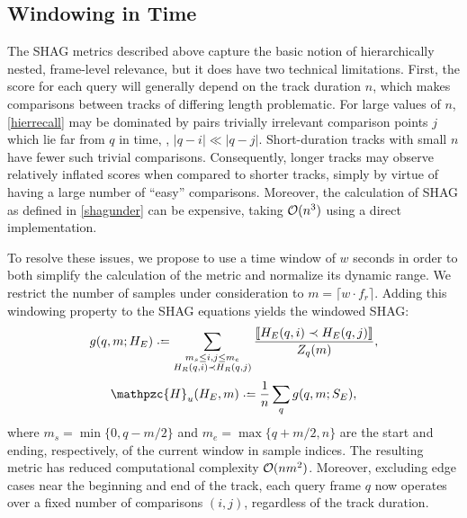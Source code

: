 \documentclass{article}
\def\shag{\ensuremath{\mathpzc{H}}}
\begin{document}

\subsection{Windowing in Time}

The SHAG metrics described above capture the basic notion of hierarchically nested, frame-level relevance, but it does have two technical limitations.
First, the score for each query will generally depend on the track duration $n$, which makes comparisons between tracks of differing length problematic.  
For large values of $n$, \cref{hierrecall} may be dominated by pairs trivially irrelevant comparison points $j$ which lie far from $q$ in time, \ie, $|q-i| \ll |q-j|$.
Short-duration tracks with small $n$ have fewer such trivial comparisons.
Consequently, longer tracks may observe relatively inflated scores when compared to shorter tracks, simply by virtue of having a large number of ``easy'' comparisons.
Moreover, the calculation of SHAG as defined in \cref{shagunder} can be expensive, taking $\mathcal{O}(n^3)$ using a direct implementation.

To resolve these issues, we propose to use a time window of $w$ seconds in order to both simplify the 
calculation of the metric and normalize its dynamic range.
We restrict the number of samples under consideration to $m = \lceil w \cdot f_r \rceil$.
Adding this windowing property to the SHAG equations yields the windowed SHAG:
\begin{equation}
  g(q, m ; H_E) \defeq \sum_{\substack{
  m_s \leq i,j \leq m_e \\ 
  H_R(q, i) \prec H_R(q, j) }} \frac{\ind{H_E(q, i) \prec H_E(q,
  j)}}{Z_q(m)},\label{windowrecall}
\end{equation}
\begin{equation}
\shag_u(H_E, m) \defeq \frac{1}{n} \sum_q g(q,m ; S_E),
\end{equation}
where $m_s = \min\{0,q-m/2\}$ and $m_e = \max\{q+m/2,n\}$ are the start and ending, respectively, of the current window in sample indices.
The resulting metric has reduced computational complexity $\mathcal{O}(nm^2)$.  Moreover, excluding edge cases near the beginning and end of the track, each query frame $q$ now operates over a
fixed number of comparisons $(i, j)$, regardless of the track duration.
\end{document}

